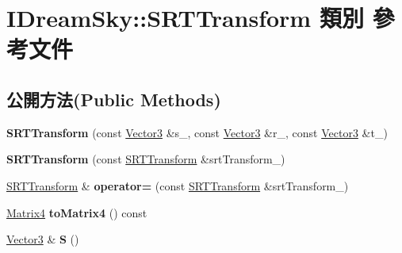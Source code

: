 \hypertarget{class_i_dream_sky_1_1_s_r_t_transform}{}\section{I\+Dream\+Sky\+:\+:S\+R\+T\+Transform 類別 參考文件}
\label{class_i_dream_sky_1_1_s_r_t_transform}
\subsection*{公開方法(Public Methods)}
\begin{DoxyCompactItemize}
\item 
{\bfseries S\+R\+T\+Transform} (const \hyperlink{class_i_dream_sky_1_1_vector3}{Vector3} \&s\+\_\+, const \hyperlink{class_i_dream_sky_1_1_vector3}{Vector3} \&r\+\_\+, const \hyperlink{class_i_dream_sky_1_1_vector3}{Vector3} \&t\+\_\+)\hypertarget{class_i_dream_sky_1_1_s_r_t_transform_a0631aa9c8a6180e024a27b3af733c87f}{}\label{class_i_dream_sky_1_1_s_r_t_transform_a0631aa9c8a6180e024a27b3af733c87f}

\item 
{\bfseries S\+R\+T\+Transform} (const \hyperlink{class_i_dream_sky_1_1_s_r_t_transform}{S\+R\+T\+Transform} \&srt\+Transform\+\_\+)\hypertarget{class_i_dream_sky_1_1_s_r_t_transform_ac0501298032d2bbc3834dd73c5ea3f8b}{}\label{class_i_dream_sky_1_1_s_r_t_transform_ac0501298032d2bbc3834dd73c5ea3f8b}

\item 
\hyperlink{class_i_dream_sky_1_1_s_r_t_transform}{S\+R\+T\+Transform} \& {\bfseries operator=} (const \hyperlink{class_i_dream_sky_1_1_s_r_t_transform}{S\+R\+T\+Transform} \&srt\+Transform\+\_\+)\hypertarget{class_i_dream_sky_1_1_s_r_t_transform_a754c423ebf4328dad08aa2f8fa7e168a}{}\label{class_i_dream_sky_1_1_s_r_t_transform_a754c423ebf4328dad08aa2f8fa7e168a}

\item 
\hyperlink{class_i_dream_sky_1_1_matrix4}{Matrix4} {\bfseries to\+Matrix4} () const \hypertarget{class_i_dream_sky_1_1_s_r_t_transform_ab8f99b567d32fb61715d6478eebcf09a}{}\label{class_i_dream_sky_1_1_s_r_t_transform_ab8f99b567d32fb61715d6478eebcf09a}

\item 
\hyperlink{class_i_dream_sky_1_1_vector3}{Vector3} \& {\bfseries S} ()\hypertarget{class_i_dream_sky_1_1_s_r_t_transform_a135a6529f5e5eca999c71a2819d48171}{}\label{class_i_dream_sky_1_1_s_r_t_transform_a135a6529f5e5eca999c71a2819d48171}


\end{DoxyCompactItemize}
